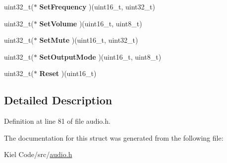 \begin{DoxyCompactItemize}
\mbox{\label{struct_a_u_d_i_o___drv_type_def_ae5b244722d0f1a115b9a2cc32987779e}} 
uint32\+\_\+t($\ast$ {\bfseries Set\+Frequency} )(uint16\+\_\+t, uint32\+\_\+t)
\item 
\mbox{\label{struct_a_u_d_i_o___drv_type_def_a13b4bc20abd9c52699c671d4cf443328}} 
uint32\+\_\+t($\ast$ {\bfseries Set\+Volume} )(uint16\+\_\+t, uint8\+\_\+t)
\item 
\mbox{\label{struct_a_u_d_i_o___drv_type_def_a1cd7d3e9b13c686c3e4bebe9b6709f23}} 
uint32\+\_\+t($\ast$ {\bfseries Set\+Mute} )(uint16\+\_\+t, uint32\+\_\+t)
\item 
\mbox{\label{struct_a_u_d_i_o___drv_type_def_a8cdc5e3ea9a629ca4b84ecf78aabb633}} 
uint32\+\_\+t($\ast$ {\bfseries Set\+Output\+Mode} )(uint16\+\_\+t, uint8\+\_\+t)
\item 
\mbox{\label{struct_a_u_d_i_o___drv_type_def_ac9d17a087e4a614abd95bf79685d00ba}} 
uint32\+\_\+t($\ast$ {\bfseries Reset} )(uint16\+\_\+t)
\end{DoxyCompactItemize}


\subsection{Detailed Description}


Definition at line 81 of file audio.\+h.



The documentation for this struct was generated from the following file\+:\begin{DoxyCompactItemize}
\item 
Kiel Code/src/\mbox{\hyperlink{audio_8h}{audio.\+h}}\end{DoxyCompactItemize}
